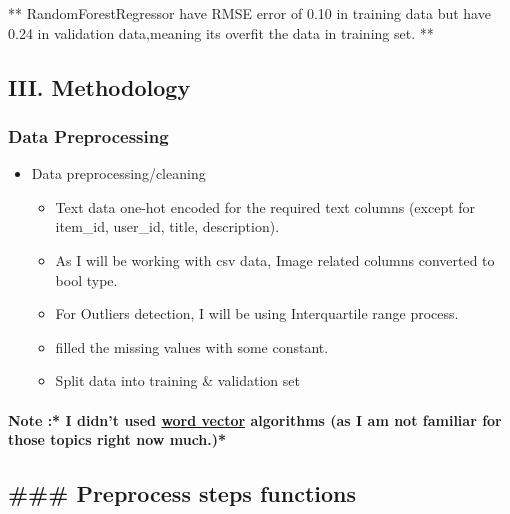\documentclass[11pt]{article}
\providecommand{\tightlist}{%
      \setlength{\itemsep}{0pt}\setlength{\parskip}{0pt}}
\begin{document}
** RandomForestRegressor have RMSE error of 0.10 in training data but
have 0.24 in validation data,meaning its overfit the data in training
set. **

    \hypertarget{iii.-methodology}{%
\subsection{III. Methodology}\label{iii.-methodology}}

    \hypertarget{data-preprocessing}{%
\subsubsection{Data Preprocessing}\label{data-preprocessing}}

    \begin{itemize}
\tightlist
\item
  Data preprocessing/cleaning

  \begin{itemize}
  \tightlist
  \item
    Text data one-hot encoded for the required text columns (except for
    item\_id, user\_id, title, description).
  \item
    As I will be working with csv data, Image related columns converted
    to bool type.
  \item
    For Outliers detection, I will be using Interquartile range process.
  \item
    filled the missing values with some constant.
  \item
    Split data into training \& validation set
  \end{itemize}
\end{itemize}

\hypertarget{note-i-didnt-used-word-vector-algorithms-as-i-am-not-familiar-for-those-topics-right-now-much.}{%
\paragraph{\texorpdfstring{Note :* I didn't used
\href{https://blog.acolyer.org/2016/04/21/the-amazing-power-of-word-vectors/}{word
vector} algorithms (as I am not familiar for those topics right now
much.)*}{Note :* I didn't used word vector algorithms (as I am not familiar for those topics right now much.)*}}\label{note-i-didnt-used-word-vector-algorithms-as-i-am-not-familiar-for-those-topics-right-now-much.}}

    \hypertarget{preprocess-steps-functions}{%
\subsection{\#\#\# Preprocess steps
functions}\label{preprocess-steps-functions}}
\end{document}
